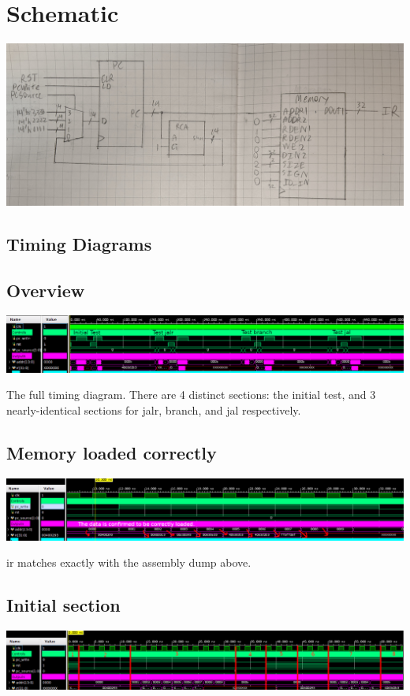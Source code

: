 \documentclass{article}
\begin{document}
\section{Schematic}
\centering
\includegraphics[width=\textwidth]{schem.jpg}

\begin{landscape}
    
\raggedright 
\section{Timing Diagrams}
\subsection{Overview}

\includegraphics[width=\linewidth]{woverview.png}

The full timing diagram. There are 4 distinct sections: the initial test, and 
3 nearly-identical sections for jalr, branch, and jal respectively. 

\subsection{Memory loaded correctly}
\includegraphics[width=\linewidth]{02.png}

ir matches exactly with the assembly dump above.

\subsection{Initial section}
\includegraphics[width=\linewidth]{01.png}


\end{landscape}
\end{document}
